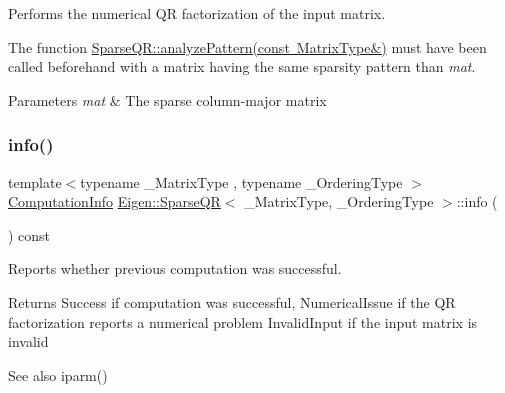 Performs the numerical QR factorization of the input matrix. 

The function \mbox{\hyperlink{class_eigen_1_1_sparse_q_r_a4b425ddb1358c914d764cde48853a4f6}{Sparse\+Q\+R\+::analyze\+Pattern(const Matrix\+Type\&)}} must have been called beforehand with a matrix having the same sparsity pattern than {\itshape mat}.


\begin{DoxyParams}{Parameters}
{\em mat} & The sparse column-\/major matrix \\
\hline
\end{DoxyParams}
\mbox{\label{class_eigen_1_1_sparse_q_r_a234b0580aaf57237393f2e73a3d38690}} 
\subsubsection{\texorpdfstring{info()}{info()}}
{\footnotesize\ttfamily template$<$typename \+\_\+\+Matrix\+Type , typename \+\_\+\+Ordering\+Type $>$ \\
\mbox{\hyperlink{group__enums_ga85fad7b87587764e5cf6b513a9e0ee5e}{Computation\+Info}} \mbox{\hyperlink{class_eigen_1_1_sparse_q_r}{Eigen\+::\+Sparse\+QR}}$<$ \+\_\+\+Matrix\+Type, \+\_\+\+Ordering\+Type $>$\+::info (\begin{DoxyParamCaption}{ }\end{DoxyParamCaption}) const\hspace{0.3cm}{\ttfamily [inline]}}



Reports whether previous computation was successful. 

\begin{DoxyReturn}{Returns}
{\ttfamily Success} if computation was successful, {\ttfamily Numerical\+Issue} if the QR factorization reports a numerical problem {\ttfamily Invalid\+Input} if the input matrix is invalid
\end{DoxyReturn}
\begin{DoxySeeAlso}{See also}
iparm() 
\end{DoxySeeAlso}
\mbox{\label{class_eigen_1_1_sparse_q_r_a1222e59649d77125d91f1368cf293c63}} 
